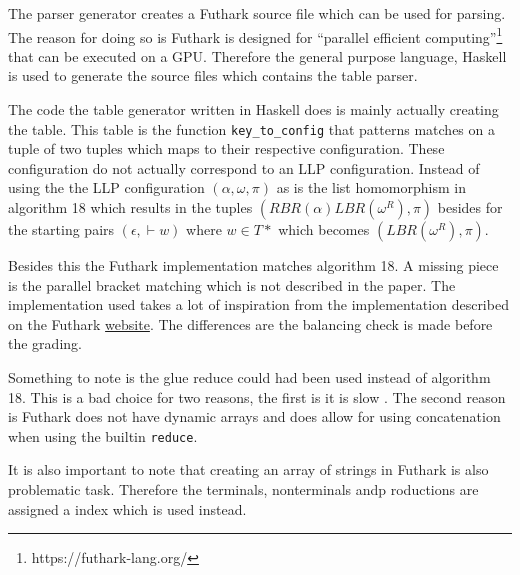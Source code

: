 The parser generator creates a Futhark source file which can be used for parsing. The reason for doing so is Futhark is designed for ``parallel efficient computing''\footnote{https://futhark-lang.org/} that can be executed on a GPU. Therefore the general purpose language, Haskell is used to generate the source files which contains the table parser.

The code the table generator written in Haskell does is mainly actually creating the table. This table is the function \lstinline{key_to_config} that patterns matches on a tuple of two tuples which maps to their respective configuration. These configuration do not actually correspond to an LLP configuration. Instead of using the the LLP configuration $(\alpha, \omega, \pi)$ as is the list homomorphism in algorithm 18 \cite[18]{Vagner2007} which results in the tuples $(RBR(\alpha)LBR(\omega^R), \pi)$ besides for the starting pairs $(\epsilon, \vdash w)$ where $w \in T*$ which becomes $(LBR(\omega^R), \pi)$.

Besides this the Futhark implementation matches algorithm 18. A missing piece is the parallel bracket matching which is not described in the paper. The implementation used takes a lot of inspiration from the implementation described on the Futhark \href{https://futhark-lang.org/examples/parens.html}{website}. The differences are the balancing check is made before the grading.

Something to note is the glue \cite[7]{Vagner2007} reduce could had been used instead of algorithm 18. This is a bad choice for two reasons, the first is it is slow \cite[17]{Vagner2007}. The second reason is Futhark does not have dynamic arrays and does allow for using concatenation when using the builtin \lstinline{reduce}.

It is also important to note that creating an array of strings in Futhark is also problematic task. Therefore the terminals, nonterminals andp roductions are assigned a index which is used instead. 